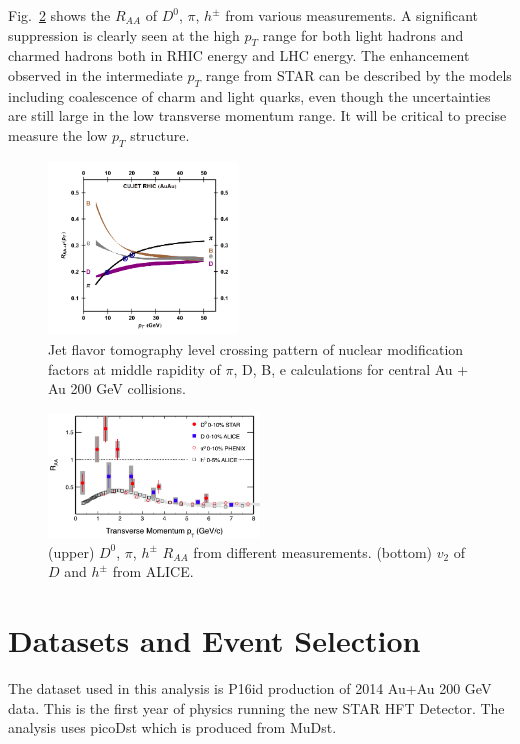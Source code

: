 \documentclass[a4paper]{article}
\begin{document}
Fig.~\ref{fig:BeforeHFT} shows the $R_{AA}$ of $D^0$, $\pi$, $h^{\pm}$ from various measurements. A significant suppression is clearly seen at the high $p_T$ range for both light hadrons and charmed hadrons both in RHIC energy and LHC energy. The enhancement observed in the intermediate $p_T$ range from STAR can be described by the models including coalescence of charm and light quarks, even though the uncertainties are still large in the low transverse momentum range. It will be critical to precise measure the low $p_T$ structure.

\begin{figure}
\centering
\includegraphics[width=0.45\textwidth]{fig/raa_CUJE.png}
\caption{Jet flavor tomography level crossing pattern of nuclear modification factors at middle rapidity of $\pi$, D, B, e calculations for central Au + Au 200 GeV collisions.}
\label{fig:raa_CUJE} 
\end{figure}

\begin{figure}
\centering
\includegraphics[width=0.5\textwidth]{fig/BeforeHFT.png}
\caption{(upper) $D^0$, $\pi$, $h^{\pm}$ $R_{AA}$ from different measurements. (bottom) $v_2$ of $D$ and $h^{\pm}$ from ALICE.}
\label{fig:BeforeHFT} 
\end{figure}

\section{\label{dataset}Datasets and Event Selection}

The dataset used in this analysis is P16id production of 2014 Au+Au 200 GeV data. This is the first year of physics running the new STAR HFT Detector. The analysis uses picoDst which is produced from MuDst.
\end{document}
